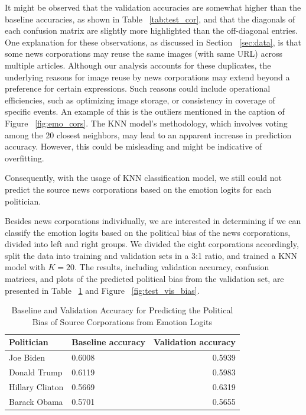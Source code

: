 \documentclass[sigconf]{acmart}
\begin{document}
It might be observed that the validation accuracies are somewhat higher than the baseline accuracies, as shown in Table ~\ref{tab:test_cor}, and that the diagonals of each confusion matrix are slightly more highlighted than the off-diagonal entries. One explanation for these observations, as discussed in Section ~\ref{sec:data}, is that some news corporations may reuse the same images (with same URL) across multiple articles. Although our analysis accounts for these duplicates, the underlying reasons for image reuse by news corporations may extend beyond a preference for certain expressions. Such reasons could include operational efficiencies, such as optimizing image storage, or consistency in coverage of specific events. An example of this is the outliers mentioned in the caption of Figure ~\ref{fig:emo_cors}. The KNN model's methodology, which involves voting among the 20 closest neighbors, may lead to an apparent increase in prediction accuracy. However, this could be misleading and might be indicative of overfitting.

Consequently, with the usage of KNN classification model, we still could not predict the source news corporations based on the emotion logits for each politician.

Besides news corporations individually, we are interested in determining if we can classify the emotion logits based on the political bias of the news corporations, divided into left and right groups. We divided the eight corporations accordingly, split the data into training and validation sets in a 3:1 ratio, and trained a KNN model with \(K=20\). The results, including validation accuracy, confusion matrices, and plots of the predicted political bias from the validation set, are presented in Table ~\ref{tab:test_bias} and Figure ~\ref{fig:test_vis_bias}.

\begin{table}[ht]
  \centering
  \renewcommand{\arraystretch}{1.2}
  \begin{tabular}{|l|l|r|}
    \hline
    \textbf{Politician} & \textbf{Baseline accuracy} & \textbf{Validation accuracy} \\ \hline
    Joe Biden & 0.6008 & 0.5939 \\ \hline
    Donald Trump & 0.6119 & 0.5983 \\ \hline
    Hillary Clinton & 0.5669 & 0.6319 \\ \hline
    Barack Obama & 0.5701 & 0.5655 \\ \hline
  \end{tabular}
  \caption{Baseline and Validation Accuracy for Predicting the Political Bias of Source Corporations from Emotion Logits}
  \label{tab:test_bias}
\end{table}
\end{document}
